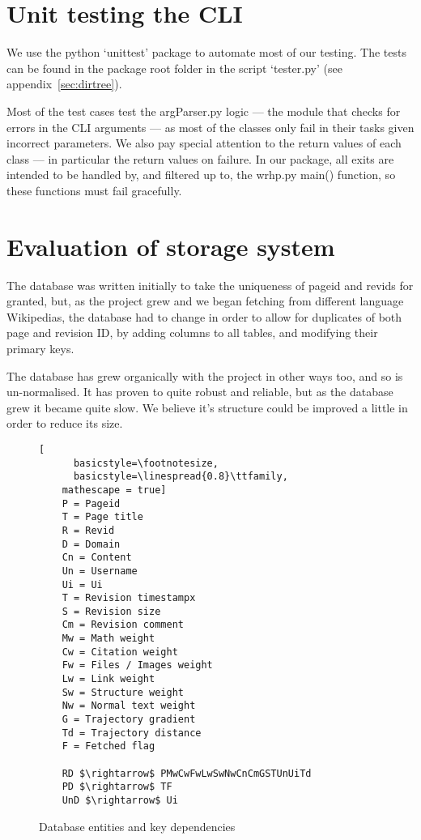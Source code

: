 \section{Unit testing the CLI}
We use the python `unittest' package to automate most of our
testing. The tests can be found in the package root folder in the
script `tester.py' (see appendix~\ref{sec:dirtree}).

Most of the test cases test the argParser.py logic --- the module that
checks for errors in the CLI arguments --- as most of the classes only
fail in their tasks given incorrect parameters. We also pay special
attention to the return values of each class --- in particular the
return values on failure. In our package, all exits are intended to be
handled by, and filtered up to, the wrhp.py main() function, so these
functions must fail gracefully.

\section{Evaluation of storage system}
The database was written initially to take the uniqueness of pageid
and revids for granted, but, as the project grew and we began fetching
from different language Wikipedias, the database had to change in
order to allow for duplicates of both page and revision ID, by adding
columns to all tables, and modifying their primary keys.

The database has grew organically with the project in other ways too,
and so is un-normalised. It has proven to quite robust and reliable,
but as the database grew it became quite slow. We believe it's
structure could be improved a little in order to reduce its size.

\begin{wrapfigure}{R}{0.45\linewidth}
  \begin{lstlisting}[
      basicstyle=\footnotesize,
      basicstyle=\linespread{0.8}\ttfamily,
    mathescape = true]
    P = Pageid
    T = Page title
    R = Revid
    D = Domain
    Cn = Content
    Un = Username
    Ui = Ui
    T = Revision timestampx
    S = Revision size
    Cm = Revision comment
    Mw = Math weight
    Cw = Citation weight
    Fw = Files / Images weight
    Lw = Link weight
    Sw = Structure weight
    Nw = Normal text weight
    G = Trajectory gradient
    Td = Trajectory distance
    F = Fetched flag

    RD $\rightarrow$ PMwCwFwLwSwNwCnCmGSTUnUiTd
    PD $\rightarrow$ TF
    UnD $\rightarrow$ Ui
  \end{lstlisting}
  \caption{Database entities and key dependencies}
  \label{fig:dat-key}
\end{wrapfigure}

